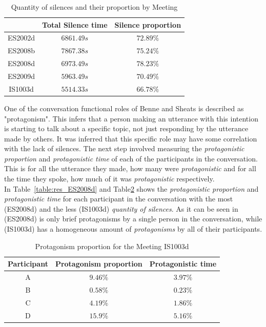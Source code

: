 \begin{table}[]
    \centering
    \begin{tabular}{ccc}
        \hline    
        & Total Silence time & Silence proportion \\ \hline
        ES2002d & $6861.49s$         & $72.89\%$  \\
        ES2008b & $7867.38s$         & $75.24\%$  \\
        ES2008d & $6973.49s$         & $78.23\%$  \\
        ES2009d & $5963.49s$         & $70.49\%$  \\
        IS1003d & $5514.33s$         & $66.78\%$  \\
        \hline
    \end{tabular}
    \caption{Quantity of silences and their proportion by Meeting}
    \label{table:ami_times}
\end{table}

One of the conversation functional roles of Benne and Sheats is described as "protagonism". This infers that a person making an utterance with this intention is starting to talk about a specific topic, not just responding by the utterance made by others. It was inferred that this specific role may have some correlation with the lack of silences. The next step involved measuring the \textit{protagonistic proportion} and \textit{protagonistic time} of each of the participants in the conversation. This is for all the utterance they made, how many were \textit{protagonistic} and for all the time they spoke, how much of it was \textit{protagonistic} respectively.\\

In Table~\ref{table:res_ES2008d} and Table\ref{table:res_IS1003d} shows the \textit{protagonistic proportion} and \textit{protagonistic time} for each participant in the conversation with the most (ES2008d) and the less (IS1003d) \textit{quantity of silences}. As it can be seen in (ES2008d) is only brief protagonisms by a single person in the conversation, while (IS1003d) has a homogeneous amount of \textit{protagonisms} by all of their participants.\\

\begin{table}[]
    \centering
    \begin{tabular}{ccc}
    \hline
    Participant & Protagonism proportion & Protagonistic time \\ \hline
    A           & $9.46\%$                & $3.97\%$            \\
    B           & $0.58\%$                & $0.23\%$            \\
    C           & $4.19\%$                & $1.86\%$            \\
    D           & $15.9\%$                & $5.16\%$
             \\
    \hline
    \end{tabular}
    \caption{Protagonism proportion for the Meeting IS1003d}
    \label{table:res_IS1003d}
\end{table}

